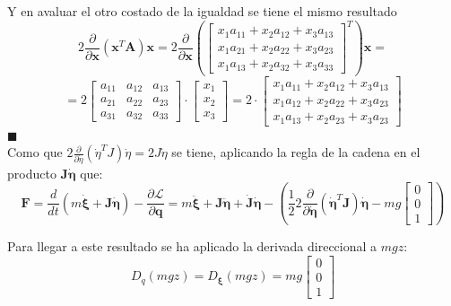 \documentclass[twoside,11pt]{book}
\begin{document}
Y en avaluar el otro costado de la igualdad se tiene el mismo resultado
\begin{equation}
2 \frac{\partial}{\partial \pmb{x}}(\pmb{x}^{T}\pmb{A})\pmb{x}=2 \frac{\partial}{\partial \pmb{x}} \left( \left[ \begin{array}{ccc}
x_1a_{11}+x_2a_{12}+x_3a_{13} \\
x_1a_{21}+x_2a_{22}+x_3a_{23} \\
x_1a_{13}+x_2a_{32}+x_3a_{33}
\end{array} \right]^{T} \right)\pmb{x}=
\end{equation}
\begin{equation}
=2\left[\begin{array}{ccc}
a_{11} & a_{12} & a_{13} \\
a_{21} & a_{22} & a_{23} \\
a_{31} & a_{32} & a_{33} 
\end{array} \right]\cdot\left[\begin{array}{c}
x_1 \\
x_2 \\
x_3
\end{array} \right]=2\cdot\left[ \begin{array}{c}
x_1a_{11}+x_2a_{12}+x_3a_{13} \\
x_1a_{12}+x_2a_{22}+x_3a_{23} \\
x_1a_{13}+x_2a_{23}+x_3a_{23}
\end{array} \right]
\end{equation}
\hfill $\blacksquare$ \\
Como que $2 \frac{\partial}{\partial \dot{\eta}}(\dot{\eta}^{T}J)\dot{\eta}=2 J \dot{\eta}$ se tiene, aplicando la regla de la cadena en el producto $\pmb{J}\pmb{\dot{\eta}}$ que:
\begin{equation}
\pmb{F}=\frac{d}{dt}\left(m \dot{\pmb{\xi}}+\pmb{J} \pmb{\dot{\eta}}\right)-\frac{\partial \mathcal{L}}{\partial \pmb{q}} =m\pmb{\ddot{\xi}} + \pmb{J}\pmb{\ddot{\eta}} + \pmb{\dot{J}}\pmb{\dot{\eta}}-\left( \frac{1}{2} 2 \frac{\partial}{\partial \pmb{\dot{\eta}}} ( \pmb{\dot{\eta}}^{T}\pmb{J})\pmb{\dot{\eta}} - mg\left[\begin{array}{c}
0 \\
0 \\
1
\end{array} \right] \right)
\end{equation}

Para llegar a este resultado se ha aplicado la derivada direccional a $mgz$:
\begin{equation}
D_q(mgz)=D_{\pmb{\xi}}(mgz)=mg \left[ \begin{array}{c}
0 \\
0 \\
1
\end{array} \right]
\end{equation}
\end{document}
